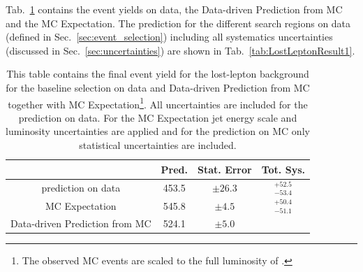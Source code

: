 Tab.~\ref{tab:LostLeptonCompare} contains the event yields on data, the Data-driven Prediction from MC and the MC Expectation. The prediction for the different search regions on data (defined in Sec.~\ref{sec:event_selection}) including all systematics uncertainties (discussed in Sec.~\ref{sec:uncertainties}) are shown in Tab.~\ref{tab:LostLeptonResult1}.
\begin{table}[hbt]
\selectfont
\begin{centering}
\caption[]{This table contains the final event yield for the lost-lepton background for the baseline selection on data and Data-driven Prediction from MC together with MC Expectation\footnote{The observed MC events are scaled to the full luminosity of \lumi.}. All uncertainties are included for the prediction on data. For the MC Expectation jet energy scale and luminosity uncertainties are applied and for the prediction on MC only statistical uncertainties are included.\label{tab:LostLeptonCompare} } 

\hspace*{-4ex}
\begin{tabular}{|c|c|c|c|}
\hline
\			& Pred. & Stat. Error	& Tot. Sys.		\\
\hline 
prediction on data	&453.5	&$\pm 26.3$	&$^{+52.5}_{-53.4}$	\\
MC Expectation	    	&545.8  &$\pm 4.5$	&$^{+50.4}_{-51.1}$	\\
Data-driven Prediction from MC	&524.1	&$\pm 5.0$	&	\\ \hline

\end{tabular}
\par\end{centering}
\end{table}

